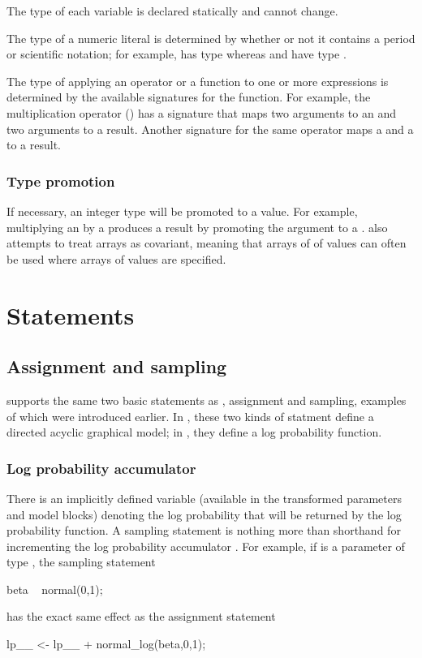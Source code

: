 \documentclass[article]{jss}
\begin{document}
The type of each variable is declared statically and cannot change.  

The type of a numeric literal is determined by whether or not it
contains a period or scientific notation; for example,  has
type  whereas  and  have type
.

The type of applying an operator or a function to one or more
expressions is determined by the available signatures for the
function.  For example, the multiplication operator (\code{*}) has a
signature that maps two  arguments to an  and two
 arguments to a  result.  Another signature for
the same operator maps a  and a  to a
 result.

\subsubsection{Type promotion}

If necessary, an integer type will be promoted to a  value.
For example, multiplying an  by a  produces a
 result by promoting the  argument to a
.   also attempts to treat arrays as
covariant, meaning that arrays of of  values can often be
used where arrays of  values are specified.

\section{Statements}

\subsection{Assignment and sampling}

 supports the same two basic statements as
, assignment and sampling, examples of which were
introduced earlier.  In , these two kinds of statment
define a directed acyclic graphical model; in , they
define a log probability function. 

\subsubsection{Log probability accumulator}

There is an implicitly defined variable  (available in
the transformed parameters and model blocks) denoting the log
probability that will be returned by the log probability function.  A
sampling statement is nothing more than shorthand for incrementing the
log probability accumulator .  For example, if 
is a parameter of type , the sampling statement
%
\begin{Code}
beta ~ normal(0,1);
\end{Code}
%
has the exact same effect as the assignment statement
%
\begin{Code}
lp__ <- lp__ + normal_log(beta,0,1);
\end{Code}
\end{document}
